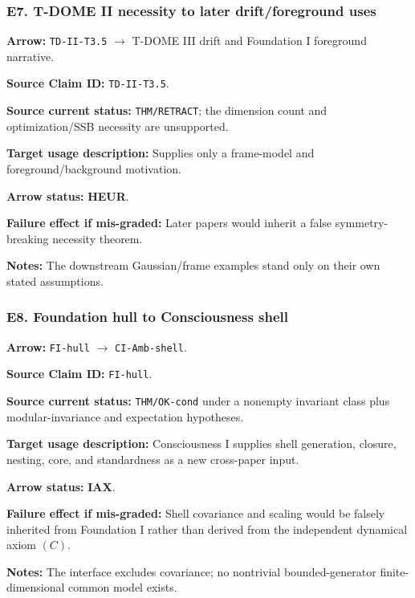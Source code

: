 \documentclass[12pt,a4paper]{article}
\begin{document}
\subsubsection*{E7. T-DOME II necessity to later drift/foreground uses}
\noindent\textbf{Arrow:} \texttt{TD-II-T3.5}
\(\to\) T-DOME III drift and Foundation I foreground narrative.\par
\noindent\textbf{Source Claim ID:} \texttt{TD-II-T3.5}.\par
\noindent\textbf{Source current status:} \texttt{THM/RETRACT}; the
dimension count and optimization/SSB necessity are unsupported.\par
\noindent\textbf{Target usage description:} Supplies only a frame-model
and foreground/background motivation.\par
\noindent\textbf{Arrow status:} \textbf{HEUR}.\par
\noindent\textbf{Failure effect if mis-graded:} Later papers would
inherit a false symmetry-breaking necessity theorem.\par
\noindent\textbf{Notes:} The downstream Gaussian/frame examples stand
only on their own stated assumptions.\par

\subsubsection*{E8. Foundation hull to Consciousness shell}
\noindent\textbf{Arrow:} \texttt{FI-hull}
\(\to\) \texttt{CI-Amb-shell}.\par
\noindent\textbf{Source Claim ID:} \texttt{FI-hull}.\par
\noindent\textbf{Source current status:} \texttt{THM/OK-cond} under a
nonempty invariant class plus modular-invariance and expectation
hypotheses.\par
\noindent\textbf{Target usage description:} Consciousness I supplies
shell generation, closure, nesting, core, and standardness as a new
cross-paper input.\par
\noindent\textbf{Arrow status:} \textbf{IAX}.\par
\noindent\textbf{Failure effect if mis-graded:} Shell covariance and
scaling would be falsely inherited from Foundation I rather than derived
from the independent dynamical axiom \((C)\).\par
\noindent\textbf{Notes:} The interface excludes covariance; no
nontrivial bounded-generator finite-dimensional common model exists.\par
\end{document}
